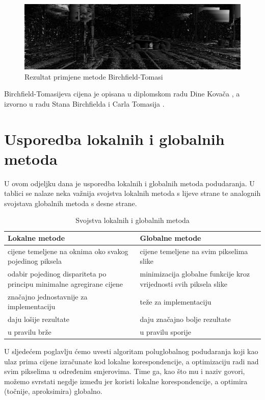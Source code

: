 \documentclass[utf8, zavrsni, numeric]{fer}
\begin{document}
\begin{figure}[htb]
  \centering
  \includegraphics[width=14cm]{img/local_000046_10_BT_1_140_scaled.png}
  \caption{Rezultat primjene metode Birchfield-Tomasi}
  \label{fig:BT-KITTI}
\end{figure}

Birchfield-Tomasijeva cijena je opisana u diplomskom radu Dine Kovača \cite{kovac15ms}, a izvorno u radu Stana Birchfielda i Carla Tomasija \cite{birchfield1998depth}.

\section{Usporedba lokalnih i globalnih metoda}
U ovom odjeljku dana je usporedba lokalnih i globalnih metoda podudaranja.
U tablici se nalaze neka važnija svojstva lokalnih metoda s lijeve strane te
analognih svojstava globalnih metoda s desne strane.

\begin{table}[H]
  \caption{Svojstva lokalnih i globalnih metoda}
  \label{tbl:usp_lok_glob}
  \centering
  \begin{tabularx}{\textwidth}{X|X} \hline
    {\bf Lokalne metode} & {\bf Globalne metode} \\
    \hline
    cijene temeljene na oknima oko svakog pojedinog piksela & cijene temeljene na svim pikselima slike \\
    \hline
    odabir pojedinog dispariteta po principu minimalne agregirane cijene & minimizacija globalne funkcije kroz vrijednosti svih piksela slike \\
    \hline
    značajno jednostavnije za implementaciju & teže za implementaciju \\
    \hline
    daju lošije rezultate & daju značajno bolje rezultate \\
    \hline
    u pravilu brže & u pravilu sporije \\
  \end{tabularx}
\end{table}

U sljedećem poglavlju ćemo uvesti algoritam poluglobalnog podudaranja koji kao ulaz prima cijene izračunate kod lokalne korespondencije, a optimizaciju radi nad svim
pikselima u određenim smjerovima. Time ga, kao što mu i naziv govori, možemo svrstati negdje između jer koristi lokalne korespondencije, a optimira (točnije, aproksimira) globalno.
\end{document}

